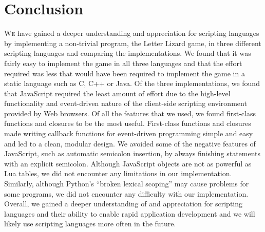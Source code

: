 \section{Conclusion}
\label{conclusion}

\lettrine[nindent=0em,lines=3]{W}{e} have gained a deeper understanding and
appreciation for scripting languages by implementing a non-trivial program,
the Letter Lizard game, in three different scripting languages and comparing the
implementations. We found that it was fairly easy to implement the game in
all three languages and that the effort required was less that would have been
required to implement the game in a static language such as C, C++ or Java.
Of the three implementations, we found that JavaScript required the least
amount of effort due to the high-level functionality and event-driven nature 
of the client-side scripting environment provided by Web browsers. Of all the features
that we used, we found first-class functions and  closures to be the most useful. 
First-class functions and closures made writing callback functions for event-driven
programming simple and easy and led to a clean, modular design. We avoided some of
the negative features of JavaScript, such as automatic semicolon insertion, by
always finishing statements with an explicit semicolon. Although JavaScript objects
are not as powerful as Lua tables, we did not encounter any limitations in our
implementation. Similarly, although Python's ``broken lexical scoping'' may cause
problems for some programs, we did not encounter any difficulty with our implementation.
Overall, we gained a deeper understanding of and appreciation for scripting languages
and their ability to enable rapid application development and we will likely use
scripting languages more often in the future.